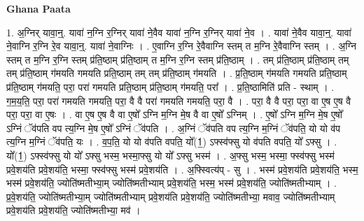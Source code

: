 \documentclass[17pt]{extarticle}
\begin{document}
\textbf{Ghana Paata } \newline

1. अ॒ग्निर् यावा॒न्॒. यावा॑ न॒ग्नि र॒ग्निर् यावा॑ ने॒वैव यावा॑ न॒ग्नि र॒ग्निर् यावा॑ ने॒व । . यावा॑ ने॒वैव यावा॒न्॒. यावा॑ ने॒वाग्नि र॒ग्नि रे॒व यावा॒न्॒. यावा॑ ने॒वाग्निः । . ए॒वाग्नि र॒ग्नि रे॒वैवाग्नि स्तम् त म॒ग्नि रे॒वैवाग्नि स्तम् । . अ॒ग्नि स्तम् त म॒ग्नि र॒ग्नि स्तम् प्र॑ति॒ष्ठाम् प्र॑ति॒ष्ठाम् त म॒ग्नि र॒ग्नि स्तम् प्र॑ति॒ष्ठाम् । . तम् प्र॑ति॒ष्ठाम् प्र॑ति॒ष्ठाम् तम् तम् प्र॑ति॒ष्ठाम् ग॑मयति गमयति प्रति॒ष्ठाम् तम् तम् प्र॑ति॒ष्ठाम् ग॑मयति । . प्र॒ति॒ष्ठाम् ग॑मयति गमयति प्रति॒ष्ठाम् प्र॑ति॒ष्ठाम् ग॑मयति॒ परा॒ परा॑ गमयति प्रति॒ष्ठाम् प्र॑ति॒ष्ठाम् ग॑मयति॒ परा᳚ । . प्र॒ति॒ष्ठामिति॑ प्रति - स्थाम् । . ग॒म॒य॒ति॒ परा॒ परा॑ गमयति गमयति॒ परा॒ वै वै परा॑ गमयति गमयति॒ परा॒ वै । . परा॒ वै वै परा॒ परा॒ वा ए॒ष ए॒ष वै परा॒ परा॒ वा ए॒षः । . वा ए॒ष ए॒ष वै वा ए॒षो᳚ ऽग्नि म॒ग्नि मे॒ष वै वा ए॒षो᳚ ऽग्निम् । . ए॒षो᳚ ऽग्नि म॒ग्नि मे॒ष ए॒षो᳚ ऽग्निं ॅव॑पति वप त्य॒ग्नि मे॒ष ए॒षो᳚ ऽग्निं ॅव॑पति । . अ॒ग्निं ॅव॑पति वप त्य॒ग्नि म॒ग्निं ॅव॑पति॒ यो यो व॑प त्य॒ग्नि म॒ग्निं ॅव॑पति॒ यः । . व॒प॒ति॒ यो यो व॑पति वपति॒ यो᳚(1॒) ऽफ्स्व॑फ्सु यो व॑पति वपति॒ यो᳚ ऽफ्सु । . यो᳚(1॒) ऽफ्स्व॑फ्सु यो यो᳚ ऽफ्सु भस्म॒ भस्मा॒फ्सु यो यो᳚ ऽफ्सु भस्म॑ । . अ॒फ्सु भस्म॒ भस्मा॒ फ्स्व॑फ्सु भस्म॑ प्रवे॒शय॑ति प्रवे॒शय॑ति॒ भस्मा॒ फ्स्व॑फ्सु भस्म॑ प्रवे॒शय॑ति । . अ॒फ्स्वित्य॑प् - सु । . भस्म॑ प्रवे॒शय॑ति प्रवे॒शय॑ति॒ भस्म॒ भस्म॑ प्रवे॒शय॑ति॒ ज्योति॑ष्मतीभ्या॒म् ज्योति॑ष्मतीभ्याम् प्रवे॒शय॑ति॒ भस्म॒ भस्म॑ प्रवे॒शय॑ति॒ ज्योति॑ष्मतीभ्याम् । . प्र॒वे॒शय॑ति॒ ज्योति॑ष्मतीभ्या॒म् ज्योति॑ष्मतीभ्याम् प्रवे॒शय॑ति प्रवे॒शय॑ति॒ ज्योति॑ष्मतीभ्या॒ मवाव॒ ज्योति॑ष्मतीभ्याम् प्रवे॒शय॑ति प्रवे॒शय॑ति॒ ज्योति॑ष्मतीभ्या॒ मव॑ । \newline
\end{document}
